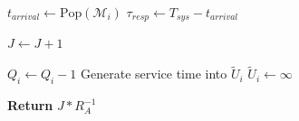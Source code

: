 \documentclass[11pt]{article}
\begin{document}
\begin{algorithm}[h]
\begin{algorithmic}[1]
    \State {}
            \State {}
            \State $t_{arrival} \gets \text{Pop}(\mathcal{M}_i)$
            \State $\tau_{resp} \gets T_{sys} - t_{arrival}$
            
                \State $J \gets J + 1$
            \EndIf
            
            \State {}
                \State $Q_i \gets Q_i - 1$
                \State Generate service time into $\tilde{U}_i$
            \Else
                \State $\tilde{U}_i \gets \infty$ 
            \EndIf
        \EndIf
    \EndFor

\EndWhile

\State \textbf{Return} $J * R_A^{-1}$

\end{algorithmic}
\end{algorithm}
\end{document}
